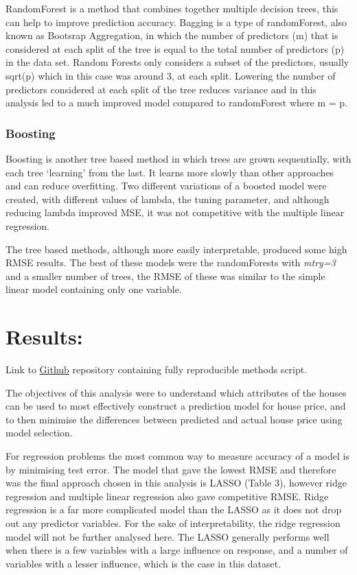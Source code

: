 \documentclass[
]{article}
\begin{document}
RandomForest is a method that combines together multiple decision trees,
this can help to improve prediction accuracy. Bagging is a type of
randomForest, also known as Bootsrap Aggregation, in which the number of
predictors (m) that is considered at each split of the tree is equal to
the total number of predictors (p) in the data set. Random Forests only
considers a subset of the predictors, usually sqrt(p) which in this case
was around 3, at each split. Lowering the number of predictors
considered at each split of the tree reduces variance and in this
analysis led to a much improved model compared to randomForest where m =
p.

\hypertarget{boosting}{%
\subsubsection{Boosting}\label{boosting}}

Boosting is another tree based method in which trees are grown
sequentially, with each tree `learning' from the last. It learns more
slowly than other approaches and can reduce overfitting. Two different
variations of a boosted model were created, with different values of
lambda, the tuning parameter, and although reducing lambda improved MSE,
it was not competitive with the multiple linear regression.

The tree based methods, although more easily interpretable, produced
some high RMSE results. The best of these models were the randomForests
with \emph{mtry=3} and a smaller number of trees, the RMSE of these was
similar to the simple linear model containing only one variable.

\hypertarget{results}{%
\section{Results:}\label{results}}

Link to
\href{https://github.com/FlorenceGalliers/C7081-assessment}{Github}
repository containing fully reproducible methods script.

The objectives of this analysis were to understand which attributes of
the houses can be used to most effectively construct a prediction model
for house price, and to then minimise the differences between predicted
and actual house price using model selection.

For regression problems the most common way to measure accuracy of a
model is by minimising test error. The model that gave the lowest RMSE
and therefore was the final approach chosen in this analysis is LASSO
(Table 3), however ridge regression and multiple linear regression also
gave competitive RMSE. Ridge regression is a far more complicated model
than the LASSO as it does not drop out any predictor variables. For the
sake of interpretability, the ridge regression model will not be further
analysed here. The LASSO generally performs well when there is a few
variables with a large influence on response, and a number of variables
with a lesser influence, which is the case in this dataset.
\end{document}
